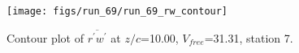 \begin{figure}[H]
\centering
\texttt{[image: figs/run\_69/run\_69\_rw\_contour]}
\caption{Contour plot of $\overline{r^\prime w^\prime}$ at $z/c$=10.00, $V_{free}$=31.31, station 7.}
\end{figure}


